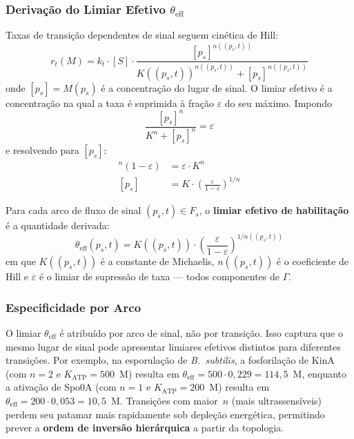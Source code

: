 \subsubsection{Derivação do Limiar Efetivo $\theta_{\mathrm{eff}}$}

Taxas de transição dependentes de sinal seguem cinética de Hill:
\begin{equation}
  r_t(M) = k_t \cdot [S] \cdot
    \frac{[p_s]^{n((p_s,t))}}{K((p_s,t))^{n((p_s,t))} + [p_s]^{n((p_s,t))}}
  \label{eq:hill-rate}
\end{equation}
onde $[p_s] = M(p_s)$ é a concentração do lugar de sinal.
O limiar efetivo é a concentração na qual a taxa é suprimida à fração
$\varepsilon$ do seu máximo.  Impondo
\[
  \frac{[p_s]^n}{K^n + [p_s]^n} = \varepsilon
\]
e resolvendo para $[p_s]$:
\begin{align}
  [p_s]^n (1 - \varepsilon) &= \varepsilon \cdot K^n \nonumber \\
  [p_s] &= K \cdot
    \left(\frac{\varepsilon}{1 - \varepsilon}\right)^{\!1/n}
  \label{eq:theta-eff-derivacao}
\end{align}

\begin{definition}
\label{def:theta-eff}
Para cada arco de fluxo de sinal $(p_s, t) \in F_s$, o \textbf{limiar efetivo
de habilitação} é a quantidade derivada:
\begin{equation}
    \theta_{\mathrm{eff}}(p_s, t) = K((p_s,t)) \cdot
      \left(\frac{\varepsilon}{1 - \varepsilon}\right)^{\!1/n((p_s,t))}
  \label{eq:theta-eff}
\end{equation}
em que $K((p_s,t))$ é a constante de Michaelis, $n((p_s,t))$ é o coeficiente
de Hill e $\varepsilon$ é o limiar de supressão de taxa --- todos componentes
de $\Gamma$.
\end{definition}

\subsubsection{Especificidade por Arco}

O limiar $\theta_{\mathrm{eff}}$ é atribuído por arco de sinal, não por
transição.  Isso captura que o mesmo lugar de sinal pode apresentar limiares
efetivos distintos para diferentes transições.  Por exemplo, na esporulação de
\textit{B.~subtilis}, a fosforilação de KinA (com $n=2$ e
$K_{\mathrm{ATP}}=500$~\textmu M) resulta em
$\theta_{\mathrm{eff}} = 500 \cdot 0{,}229 = 114{,}5$~\textmu M, enquanto a
ativação de Spo0A (com $n=1$ e $K_{\mathrm{ATP}}=200$~\textmu M) resulta em
$\theta_{\mathrm{eff}} = 200 \cdot 0{,}053 = 10{,}5$~\textmu M.
Transições com maior~$n$ (mais ultrassensíveis) perdem seu patamar mais
rapidamente sob depleção energética, permitindo prever a \textbf{ordem de
inversão hierárquica} a partir da topologia.


